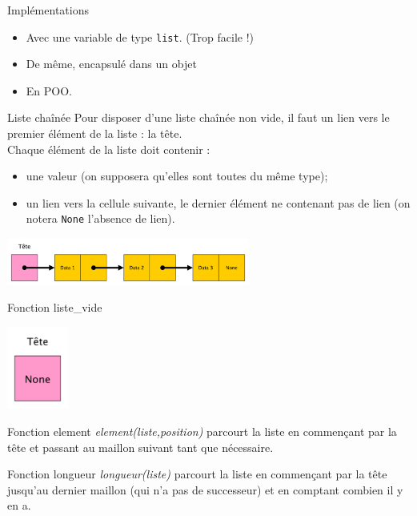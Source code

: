 \documentclass[10pt]{beamer}
\begin{document}
\begin{frame}{Implémentations}
	\begin{itemize}
    	\item	Avec une variable de type \texttt{list}. (Trop facile !)
    	\item	De même, encapsulé dans un objet
        \item 	En POO.
    \end{itemize}
\end{frame}

\begin{frame}[fragile]{Liste chaînée}
	Pour disposer d'une liste chaînée non vide, il faut un lien vers le premier élément de la liste : la tête.\\
	Chaque élément de la liste doit contenir :
	\begin{itemize}
		\item une valeur (on supposera qu'elles sont toutes du même type);
		\item un lien vers la cellule suivante, le dernier élément ne contenant pas de lien (on notera \texttt{None} l'absence de lien).
	\end{itemize}
	\begin{center}
	\includegraphics[width=8cm]{img/liste_chainee1}
	\end{center}
\end{frame}
\begin{frame}{Fonction liste\_vide}
	\begin{center}
		\includegraphics[width=2cm]{img/liste_vide}
	\end{center}
\end{frame}
\begin{frame}{Fonction element}
	\textit{element(liste,position)} parcourt la liste en commençant par la tête et passant au maillon suivant tant que nécessaire.
\end{frame}
\begin{frame}{Fonction longueur}
	\textit{longueur(liste)} parcourt la liste en commençant par la tête jusqu'au dernier maillon (qui n'a pas de successeur) et en comptant combien il y en a.
\end{frame}
\end{document}
